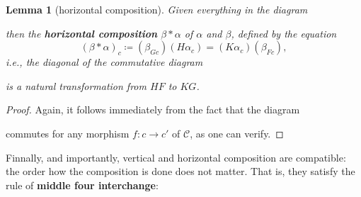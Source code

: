 \documentclass{article}
\newtheorem{lemma}[theorem]{Lemma}
\theoremstyle{definition}
\theoremstyle{definition}
\theoremstyle{remark}
\begin{document}
	\begin{lemma}[horizontal composition]
	Given everything in the diagram
	\begin{center}
	\end{center}
	then the \textbf{horizontal composition} $\beta\ast\alpha$ of $\alpha$ and $\beta$, defined by the equation
	\[(\beta\ast\alpha)_c\coloneqq (\beta_{Gc})(H\alpha_c)=(K\alpha_c)(\beta_{Fc}),\]
	i.e., the diagonal of the commutative diagram
	\begin{center}
	\end{center}
	is a natural transformation from $HF$ to $KG$.
	\end{lemma}
	\begin{proof}
	Again, it follows immediately from the fact that the diagram
	\begin{center}
	\end{center}
	commutes for any morphism $f:c\to c'$ of $\mathcal{C}$, as one can verify.
	\end{proof}
	Finnally, and importantly, vertical and horizontal composition are compatible: the order how the composition is done does not matter. That is, they satisfy the rule of \textbf{middle four interchange}:
\end{document}

